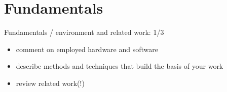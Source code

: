
\chapter{Fundamentals}%
\label{sec:fundamentals}

Fundamentals / environment and related work: 1/3

\begin{itemize}
    \item comment on employed hardware and software
    \item describe methods and techniques that build the basis of your work
    \item review related work(!)
\end{itemize}
